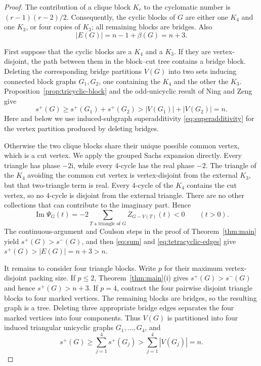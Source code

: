 \documentclass[11pt]{article}
\theoremstyle{definition}
\theoremstyle{remark}
\newcommand{\ii}{\mathrm{i}}
\begin{document}
\begin{proof}
The contribution of a clique block $K_r$ to the cyclomatic number is
$(r-1)(r-2)/2$.  Consequently, the cyclic blocks of $G$ are either one
$K_4$ and one $K_3$, or four copies of $K_3$; all remaining blocks are
bridges.  Also
\begin{equation}\label{eq:tetracyclic-edges}
 |E(G)|=n-1+\beta(G)=n+3.
\end{equation}

First suppose that the cyclic blocks are a $K_4$ and a $K_3$.  If they are
vertex-disjoint, the path between them in the block--cut tree contains a
bridge block.  Deleting the corresponding bridge partitions $V(G)$ into
two sets inducing connected block graphs $G_1,G_2$, one containing the
$K_4$ and the other the $K_3$.  Proposition~\ref{prop:tricyclic-block} and
the odd-unicyclic result of Ning and Zeng give
\[
 s^+(G)\ge s^+(G_1)+s^+(G_2)
 >|V(G_1)|+|V(G_2)|=n.
\]
Here and below we use induced-subgraph superadditivity
\eqref{eq:superadditivity} for the vertex partition produced by deleting
bridges.

Otherwise the two clique blocks share their unique possible common vertex,
which is a cut vertex.  We apply the grouped Sachs expansion directly.
Every triangle has phase $-2\ii$, while every $4$-cycle has the real phase
$-2$.  The triangle of the $K_4$ avoiding the common cut vertex is
vertex-disjoint from the external $K_3$, but that two-triangle term is real.
Every $4$-cycle of the $K_4$ contains the cut vertex, so no $4$-cycle is
disjoint from the external triangle.  There are no other collections that
can contribute to the imaginary part.  Hence
\[
 \operatorname{Im}\Psi_G(t)
 =-2\sum_{T\text{ a triangle of }G}Z_{G-V(T)}(t)<0
 \qquad(t>0).
\]
The continuous-argument and Coulson steps in the proof of
Theorem~\ref{thm:main} yield $s^+(G)>s^-(G)$, and then
\eqref{eq:sum} and \eqref{eq:tetracyclic-edges} give
$s^+(G)>|E(G)|=n+3>n$.

It remains to consider four triangle blocks.  Write $p$ for their maximum
vertex-disjoint packing size.  If $p\le2$, Theorem~\ref{thm:main}(i) gives
$s^+(G)>s^-(G)$ and hence $s^+(G)>n+3$.  If $p=4$, contract the four
pairwise disjoint triangle blocks to four marked vertices.  The remaining
blocks are bridges, so the resulting graph is a tree.  Deleting three
appropriate bridge edges separates the four marked vertices into four
components.  Thus $V(G)$ is partitioned into four induced triangular
unicyclic graphs $G_1,\ldots,G_4$, and
\[
 s^+(G)\ge\sum_{j=1}^4s^+(G_j)
 >\sum_{j=1}^4|V(G_j)|=n.
\]


\end{proof}
\end{document}
